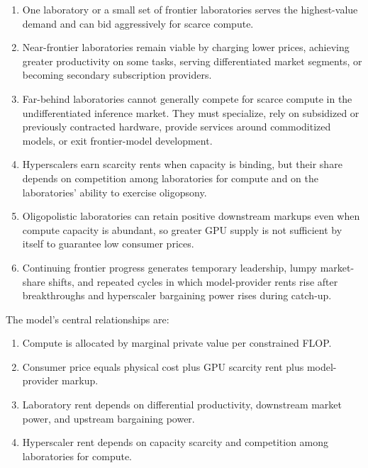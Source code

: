 \documentclass[11pt]{article}
\begin{document}
\begin{enumerate}
\item One laboratory or a small set of frontier laboratories serves the highest-value demand and can bid aggressively for scarce compute.
\item Near-frontier laboratories remain viable by charging lower prices, achieving greater productivity on some tasks, serving differentiated market segments, or becoming secondary subscription providers.
\item Far-behind laboratories cannot generally compete for scarce compute in the undifferentiated inference market. They must specialize, rely on subsidized or previously contracted hardware, provide services around commoditized models, or exit frontier-model development.
\item Hyperscalers earn scarcity rents when capacity is binding, but their share depends on competition among laboratories for compute and on the laboratories' ability to exercise oligopsony.
\item Oligopolistic laboratories can retain positive downstream markups even when compute capacity is abundant, so greater GPU supply is not sufficient by itself to guarantee low consumer prices.
\item Continuing frontier progress generates temporary leadership, lumpy market-share shifts, and repeated cycles in which model-provider rents rise after breakthroughs and hyperscaler bargaining power rises during catch-up.
\end{enumerate}

The model's central relationships are:

\begin{enumerate}[label=\textbf{\arabic*.}]
\item Compute is allocated by marginal private value per constrained FLOP.
\item Consumer price equals physical cost plus GPU scarcity rent plus model-provider markup.
\item Laboratory rent depends on differential productivity, downstream market power, and upstream bargaining power.
\item Hyperscaler rent depends on capacity scarcity and competition among laboratories for compute.
\end{enumerate}
\end{document}
